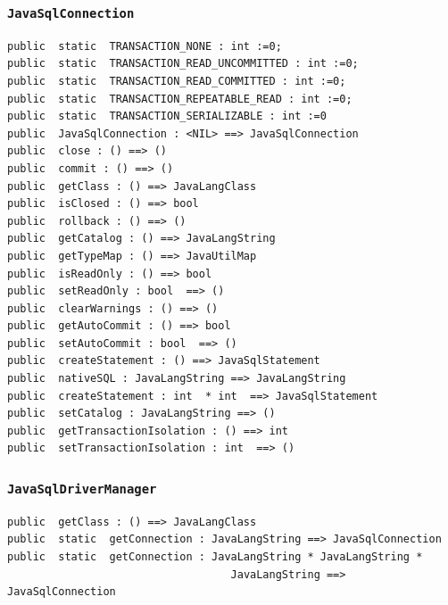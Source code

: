 \documentclass[\pformat,12pt]{article}
\begin{document}
\subsubsection{\texttt{JavaSqlConnection}}
\begin{small}
\begin{verbatim}
public  static  TRANSACTION_NONE : int :=0;
public  static  TRANSACTION_READ_UNCOMMITTED : int :=0;
public  static  TRANSACTION_READ_COMMITTED : int :=0;
public  static  TRANSACTION_REPEATABLE_READ : int :=0;
public  static  TRANSACTION_SERIALIZABLE : int :=0
public  JavaSqlConnection : <NIL> ==> JavaSqlConnection
public  close : () ==> ()
public  commit : () ==> ()
public  getClass : () ==> JavaLangClass
public  isClosed : () ==> bool
public  rollback : () ==> ()
public  getCatalog : () ==> JavaLangString
public  getTypeMap : () ==> JavaUtilMap
public  isReadOnly : () ==> bool
public  setReadOnly : bool  ==> ()
public  clearWarnings : () ==> ()
public  getAutoCommit : () ==> bool
public  setAutoCommit : bool  ==> ()
public  createStatement : () ==> JavaSqlStatement
public  nativeSQL : JavaLangString ==> JavaLangString
public  createStatement : int  * int  ==> JavaSqlStatement
public  setCatalog : JavaLangString ==> ()
public  getTransactionIsolation : () ==> int
public  setTransactionIsolation : int  ==> ()
\end{verbatim}
\end{small}

\subsubsection{\texttt{JavaSqlDriverManager}}
\begin{small}
\begin{verbatim}
public  getClass : () ==> JavaLangClass
public  static  getConnection : JavaLangString ==> JavaSqlConnection
public  static  getConnection : JavaLangString * JavaLangString * 
                                   JavaLangString ==> JavaSqlConnection
\end{verbatim}
\end{small}
\end{document}

